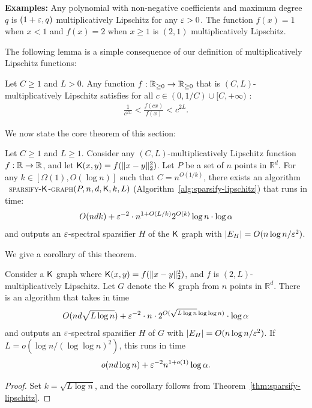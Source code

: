 \textbf{Examples:} Any polynomial with non-negative coefficients and maximum degree $q$ is $(1+\varepsilon, q)$ multiplicatively Lipschitz for any $\varepsilon > 0$. The function $f(x) = 1$ when $x < 1$ and $f(x) = 2$ when $x \geq 1$ is $(2, 1)$ multiplicatively Lipschitz.


The following lemma is a simple consequence of our definition of multiplicatively Lipschitz functions:
\begin{lemma}\label{lem:lip} 
Let $C \geq 1$ and $L > 0$. Any function $f : {\mathbb R}_{\geq 0} \rightarrow {\mathbb R}_{\geq 0}$ that is $(C, L)$-multiplicatively Lipschitz satisfies for all $c \in (0,1/C) \cup [C, +\infty)$ :
\begin{align*}
\frac{1}{c^{2L}} < \frac{f(cx)}{f(x)} < c^{2L} .
\end{align*}
\end{lemma}



We now state the core theorem of this section: 
\begin{theorem}\label{thm:sparsify-lipschitz}
Let $C\geq 1$ and $L \geq 1$. 
  Consider any $(C, L)$-multiplicatively
  Lipschitz function $f : {\mathbb R} \rightarrow {\mathbb R}$, and let $\mathsf{K}(x,y)=f(\|x-y\|_2^2)$. Let $P$ be a set of $n$ points in $\mathbb{R}^d$. For any $k \in [\Omega(1) , O(\log n)]$  
  such that $C = n^{O(1/k)}$, there exists an algorithm ~\textsc{sparsify-$\mathsf{K}$-graph}$(P,n,d, \mathsf{K}, k, L)$ (Algorithm~\ref{alg:sparsify-lipschitz}) that runs in time: 
  \begin{align*}
  O( ndk )  + 
  \varepsilon^{-2} \cdot n^{1+O(L/k)} 2^{O(k)} \log n \cdot \log \alpha 
  \end{align*}
  and outputs an $\varepsilon$-spectral sparsifier $H$ of the $\mathsf{K}$ graph with $|E_H| = O(n \log n /\varepsilon^2)$.
\end{theorem}
 We give a corollary of this theorem.
\begin{corollary}\label{cor:poly-sparse}
Consider a $\mathsf{K}$ graph where $\mathsf{K}(x,y) = f(\|x-y\|_2^2)$, and $f$ is $(2, L)$-multiplicatively Lipschitz. Let $G$ denote the $\mathsf{K}$ graph from $n$ points in $\mathbb{R}^d$. There is an algorithm that takes in time
\begin{align*}
O(n d \sqrt{L \log n} ) + \varepsilon^{-2} \cdot n \cdot 2^{O(\sqrt{L \log n} \log\log n )} \cdot \log \alpha  
\end{align*}
and outputs an $\varepsilon$-spectral sparsifier $H$ of $G$ with $|E_H| = O( n \log n / \varepsilon^2)$. 
If $L = o( \log n/ (\log \log n)^2)$, this runs in time 
\begin{align*}
o(nd \log n) + \varepsilon^{-2}  n^{1+o(1)} \log \alpha.
\end{align*}
\end{corollary}
\begin{proof} 
Set $k = \sqrt{L \log n}$, and the corollary follows from Theorem~\ref{thm:sparsify-lipschitz}.
\end{proof}

